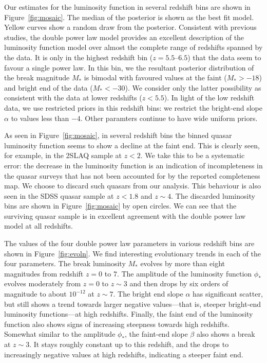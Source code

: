 \documentclass[a4paper,fleqn,usenatbib]{mnras}
\begin{document}
Our estimates for the luminosity function in several redshift bins are
shown in Figure~\ref{fig:mosaic}.  The median of the posterior is
shown as the best fit model.  Yellow curves show a random draw from
the posterior.  Consistent with previous studies, the double power law
model provides an excellent description of the luminosity function
model over almost the complete range of redshifts spanned by the data.
It is only in the highest redshift bin ($z=5.5$--$6.5$) that the data
seem to favour a single power law.  In this bin, we the resultant
posterior distribution of the break magnitude $M_*$ is bimodal with
favoured values at the faint ($M_*>-18$) and bright end of the data
($M_*<-30$).  We consider only the latter possibility as consistent
with the data at lower redshifts ($z<5.5$).  In light of the low
redshift data, we use restricted priors in this redshift bins: we
restrict the bright-end slope $\alpha$ to values less than $-4$.
Other paramters continue to have wide uniform priors.

As seen in Figure~\ref{fig:mosaic}, in several redshift bins the
binned quasar luminosity function seems to show a decline at the faint
end.  This is clearly seen, for example, in the 2SLAQ sample at $z<2$.
We take this to be a systematic error: the decrease in the luminosity
function is an indication of incompleteness in the quasar surveys that
has not been accounted for by the reported completeness map.  We
choose to discard such quasars from our analysis.  This behaviour is
also seen in the SDSS quasar sample at $z<1.8$ and $z\sim 4$.  The
discarded luminosity bins are shown in Figure~\ref{fig:mosaic} by open
circles.  We can see that the surviving quasar sample is in excellent
agreement with the double power law model at all redshifts.

The values of the four double power law parameters in various redshift
bins are shown in Figure~\ref{fig:evoln}.  We find interesting
evolutionary trends in each of the four parameters.  The break
luminosity $M_*$ evolves by more than eight magnitudes from redshift
$z=0$ to $7$.  The amplitude of the luminosity function $\phi_*$
evolves moderately from $z=0$ to $z\sim 3$ and then drops by six
orders of magnitude to about $10^{-12}$ at $z\sim 7$.  The bright end
slope $\alpha$ has significant scatter, but still shows a trend
towards larger negative values---that is, steeper bright-end
luminosity functions---at high redshifts.  Finally, the faint end of
the luminosity function also shows signs of increasing steepness
towards high redshifts.  Somewhat similar to the amplitude $\phi_*$,
the faint-end slope $\beta$ also shows a break at $z\sim 3$.  It stays
roughly constant up to this redshift, and the drops to increasingly
negative values at high redshifts, indicating a steeper faint end.
\end{document}
